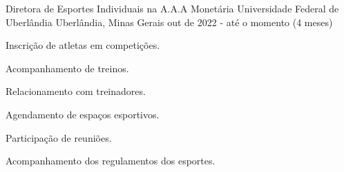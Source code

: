 \cventry
    {Diretora de Esportes Individuais na A.A.A Monetária} %
    {Universidade Federal de Uberlândia} %
    {Uberlândia, Minas Gerais} %
    {out de 2022 - até o momento (4 meses)} %
    {
        \begin{cvitems} %
            \item {Inscrição de atletas em competições.}
            \item {Acompanhamento de treinos.}
            \item {Relacionamento com treinadores.}
            \item {Agendamento de espaços esportivos.}
            \item {Participação de reuniões.}
            \item {Acompanhamento dos regulamentos dos esportes.}
        \end{cvitems}
    }